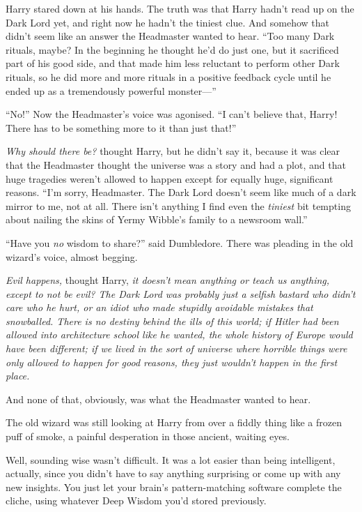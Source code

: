 Harry stared down at his hands. The truth was that Harry hadn't read up
on the Dark Lord yet, and right now he hadn't the tiniest clue. And
somehow that didn't seem like an answer the Headmaster wanted to hear.
``Too many Dark rituals, maybe? In the beginning he thought he'd do just
one, but it sacrificed part of his good side, and that made him less
reluctant to perform other Dark rituals, so he did more and more rituals
in a positive feedback cycle until he ended up as a tremendously
powerful monster---''

``No!'' Now the Headmaster's voice was agonised. ``I can't believe that,
Harry! There has to be something more to it than just that!''

\emph{Why should there be?} thought Harry, but he didn't say it, because
it was clear that the Headmaster thought the universe was a story and
had a plot, and that huge tragedies weren't allowed to happen except for
equally huge, significant reasons. ``I'm sorry, Headmaster. The Dark
Lord doesn't seem like much of a dark mirror to me, not at all. There
isn't anything I find even the \emph{tiniest} bit tempting about nailing
the skins of Yermy Wibble's family to a newsroom wall.''

``Have you \emph{no} wisdom to share?'' said Dumbledore. There was
pleading in the old wizard's voice, almost begging.

\emph{Evil happens,} thought Harry, \emph{it doesn't mean anything or
teach us anything, except to not be evil? The Dark Lord was probably
just a selfish bastard who didn't care who he hurt, or an idiot who made
stupidly avoidable mistakes that snowballed. There is no destiny behind
the ills of this world; if Hitler had been allowed into architecture
school like he wanted, the whole history of Europe would have been
different; if we lived in the sort of universe where horrible things
were only allowed to happen for good reasons, they just wouldn't happen
in the first place.}

And none of that, obviously, was what the Headmaster wanted to hear.

The old wizard was still looking at Harry from over a fiddly thing like
a frozen puff of smoke, a painful desperation in those ancient, waiting
eyes.

Well, sounding wise wasn't difficult. It was a lot easier than being
intelligent, actually, since you didn't have to say anything surprising
or come up with any new insights. You just let your brain's
pattern-matching software complete the cliche, using whatever Deep
Wisdom you'd stored previously.

